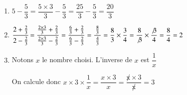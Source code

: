 \documentclass[oneside,12pt]{exam}          %
\begin{document}
\begin{enumerate}[itemsep = 3mm]
	\item $5 - \dfrac{5}{3} = \dfrac{5\times3}{3} -\dfrac{5}{3} = \dfrac{25}{3} - \dfrac{5}{3} = \dfrac{20}{3}$
	
	\item $\cfrac{2+\frac{2}{3}}{2-\frac{2}{3}} = 
	\dfrac{\frac{2\times3}{3} + \frac{2}{3}}{\frac{2\times3}{3} - \frac{2}{3}} =
	\dfrac{\frac{6}{3} + \frac{2}{3}}{\frac{6}{3} - \frac{2}{3}} =
	\dfrac{\frac{8}{3}}{\,\frac{4}{3}\,} = \dfrac{8}{3} \times \dfrac{3}{4} 
	= \dfrac{8}{\not3} \times \dfrac{\not3}{4} = \dfrac{8}{4} = 2$
	
	\item Notons $x$ le nombre choisi. L'inverse de $x$ est $\dfrac{1}{x}$
	
	On calcule donc $x \times 3 \times \dfrac{1}{x} = \dfrac{x \times 3}{x} = \dfrac{\not x \times 3}{\not x} = 3$
\end{enumerate}
\end{document}

